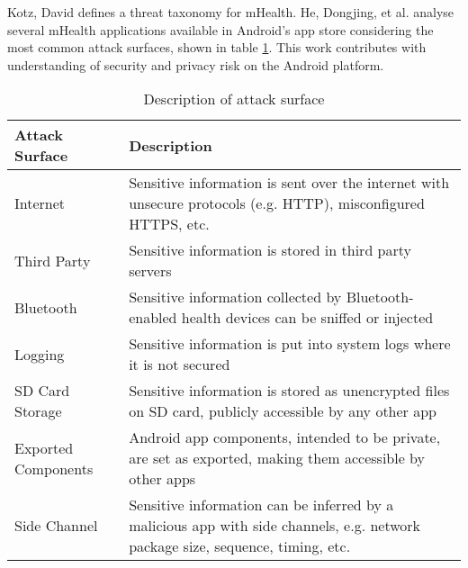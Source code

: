 Kotz, David \cite{kotz2011threat} defines a threat taxonomy for mHealth. He, Dongjing, et al. \cite{he2014security} analyse several mHealth applications available in Android's app store considering the most common attack surfaces, shown in table \ref{tab:attacksurfaces}. This work contributes with understanding of security and privacy risk on the Android platform.

\begin{table}
	\caption {Description of attack surface}
	\label{tab:attacksurfaces}
	\begin{tabular}{|>{\raggedright}p{2cm}|>{\raggedright\arraybackslash}p{10cm}|}
		\hline
		\textbf{Attack Surface}      & \textbf{Description}                                                                                                                    \\ \hline
		Internet            & Sensitive information is sent over the internet with unsecure protocols (e.g. HTTP), misconfigured HTTPS, etc.                 \\ \hline
		Third Party         & Sensitive information is stored in third party servers                                                                         \\ \hline
		Bluetooth           & Sensitive information collected by Bluetooth-enabled health devices can be sniffed or injected                                 \\ \hline
		Logging             & Sensitive information is put into system logs where it is not secured                                                          \\ \hline
		SD Card Storage     & Sensitive information is stored as unencrypted files on SD card, publicly accessible by any other app                          \\ \hline
		Exported Components &  Android app components, intended to be private, are set as exported, making them accessible by other apps                     \\ \hline
		Side Channel        & Sensitive information can be inferred by a malicious app with side channels, e.g. network package size, sequence, timing, etc. \\ \hline
	\end{tabular}
\end{table}
\FloatBarrier

